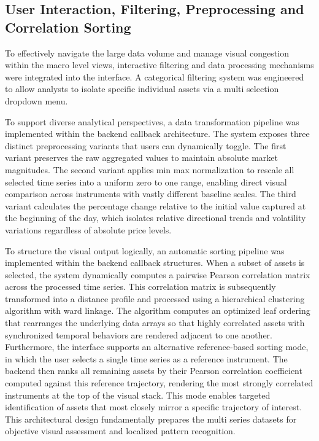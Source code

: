 \documentclass[final,3p,times,twocolumn]{elsarticle}
\begin{document}
\subsection{User Interaction, Filtering, Preprocessing and Correlation Sorting}\label{sec_sorting_methods}
To effectively navigate the large data volume and manage visual congestion within the macro level views, interactive filtering and data processing mechanisms were integrated into the interface. A categorical filtering system was engineered to allow analysts to isolate specific individual assets via a multi selection dropdown menu.

To support diverse analytical perspectives, a data transformation pipeline was implemented within the backend callback architecture. The system exposes three distinct preprocessing variants that users can dynamically toggle. The first variant preserves the raw aggregated values to maintain absolute market magnitudes. The second variant applies min max normalization to rescale all selected time series into a uniform zero to one range, enabling direct visual comparison across instruments with vastly different baseline scales. The third variant calculates the percentage change relative to the initial value captured at the beginning of the day, which isolates relative directional trends and volatility variations regardless of absolute price levels.

To structure the visual output logically, an automatic sorting pipeline was implemented within the backend callback structures. When a subset of assets is selected, the system dynamically computes a pairwise Pearson correlation matrix across the processed time series. This correlation matrix is subsequently transformed into a distance profile and processed using a hierarchical clustering algorithm with ward linkage. The algorithm computes an optimized leaf ordering that rearranges the underlying data arrays so that highly correlated assets with synchronized temporal behaviors are rendered adjacent to one another. Furthermore, the interface supports an alternative reference-based sorting mode, in which the user selects a single time series as a reference instrument. The backend then ranks all remaining assets by their Pearson correlation coefficient computed against this reference trajectory, rendering the most strongly correlated instruments at the top of the visual stack. This mode enables targeted identification of assets that most closely mirror a specific trajectory of interest. This architectural design fundamentally prepares the multi series datasets for objective visual assessment and localized pattern recognition.
\end{document}
